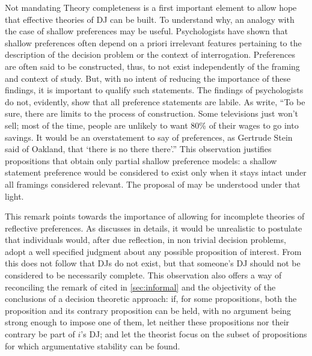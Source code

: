 \documentclass[version=last, pagesize, twoside=off, bibliography=totoc, DIV=calc, fontsize=12pt, a4paper, french, english]{scrartcl}
\begin{document}
Not mandating Theory completeness is a first important element to allow hope that effective theories of \ac{DJ} can be built. 
To understand why, an analogy with the case of shallow preferences may be useful.
Psychologists have shown that shallow preferences often depend on a priori irrelevant features pertaining to the description of the decision problem or the context of interrogation. Preferences are often said to be constructed, thus, to not exist independently of the framing and context of study.
But, with no intent of reducing the importance of these findings, it is important to qualify such statements. 
The findings of psychologists do not, evidently, show that all preference statements are labile. As \citet[p.\ xvi]{lichtenstein_construction_2006} write, “To be sure, there are limits to the process of construction. Some televisions just won’t sell; most of the time, people are unlikely to want 80\% of their wages to go into savings. It would be an overstatement to say of preferences, as Gertrude Stein said of Oakland, that ‘there is no there there’.”
This observation justifies propositions that obtain only partial shallow preference models: a shallow statement preference would be considered to exist only when it stays intact under all framings considered relevant. The proposal of \citet{bernheim_beyond_2009} may be understood under that light.

This remark points towards the importance of allowing for incomplete theories of reflective preferences.  
As \citet{mandler_difficult_2001} discusses in details, it would be unrealistic to postulate that individuals would, after due reflection, in non trivial decision problems, adopt a well specified judgment about any possible proposition of interest.
From this does not follow that \acp{DJ} do not exist, but that someone’s \ac{DJ} should not be considered to be necessarily complete. 
This observation also offers a way of reconciling the remark of \citet{roy_comparison_1995} cited in \cref{sec:informal} and the objectivity of the conclusions of a decision theoretic approach: if, for some propositions, both the proposition and its contrary proposition can be held, with no argument being strong enough to impose one of them, let neither these propositions nor their contrary be part of $i$’s \ac{DJ}; and let the theorist focus on the subset of propositions for which argumentative stability can be found.
\end{document}
